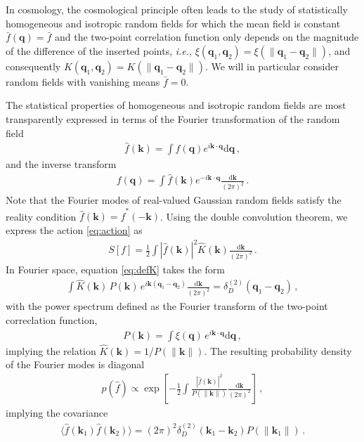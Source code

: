 \documentclass[a4paper, 11pt]{article}
\begin{document}
In cosmology, the cosmological principle often leads to the study of statistically homogeneous and isotropic random fields for which the mean field is constant $\bar{f}(\bm{q})=\bar{f}$ and the two-point correlation function only depends on the magnitude of the difference of the inserted points, \textit{i.e.}, $\xi(\bm{q}_1,\bm{q}_2)=\xi(\|\bm{q}_1-\bm{q}_2\|)$, and consequently $K(\bm{q}_1,\bm{q}_2)=K(\|\bm{q}_1-\bm{q}_2\|)$. We will in particular consider random fields with vanishing means $\bar{f}=0$. 

The statistical properties of homogeneous and isotropic random fields are most transparently expressed in terms of the Fourier transformation of the random field
\begin{align}
\hat{f}(\bm{k}) = \int f(\bm{q})e^{i\bm{k}\cdot \bm{q}}\mathrm{d}\bm{q}\,,
\end{align}
and the inverse transform
\begin{align}
f(\bm{q}) = \int \hat{f}(\bm{k})e^{-i \bm{k} \cdot \bm{q}}\frac{\mathrm{d}\bm{k}}{(2\pi)^2}\,.
\end{align}
Note that the Fourier modes of real-valued Gaussian random fields satisfy the reality condition $\hat{f}(\bm{k}) = \hat{f}^*(-\bm{k})$. Using the double convolution theorem, we express the action \eqref{eq:action} as
\begin{align}
S[f] = \frac{1}{2} \int |\hat{f}(\bm{k})|^2 \hat{K}(\bm{k}) \frac{\mathrm{d}\bm{k}}{(2\pi)^2}\,.
\end{align}
In Fourier space, equation \eqref{eq:defK} takes the form
\begin{align}
\int \hat{K}(\bm{k})\, P(\bm{k})\, e^{i\bm{k}(\bm{q}_1-\bm{q}_2)} \frac{\mathrm{d}\bm{k}}{(2\pi)^2} = \delta_D^{(2)}(\bm{q}_1 - \bm{q}_2)\,,
\end{align}
with the power spectrum defined as the Fourier transform of the two-point correclation function,
\begin{align}
P(\bm{k}) = \int \xi(\bm{q}) \, e^{i\bm{k}\cdot \bm{q}}\mathrm{d}\bm{q}\,,
\end{align}
implying the relation $\hat{K}(\bm{k}) = 1/P(\|\bm{k}\|)$. The resulting probability density of the Fourier modes is diagonal
\begin{align}
p(\hat{f}) \propto \exp\left[ -\frac{1}{2} \int \frac{|\hat{f}(\bm{k})|^2}{P(\|\bm{k}\|)} \frac{\mathrm{d}\bm{k}}{(2\pi)^2}\right]\,,
\end{align}
implying the covariance
\begin{align}
\langle \hat{f}(\bm{k}_1)\hat{f}(\bm{k}_2) \rangle = (2\pi)^2 \delta_D^{(2)}(\bm{k}_1-\bm{k}_2) P(\|\bm{k}_1\|)\,.
\end{align}
\end{document}
